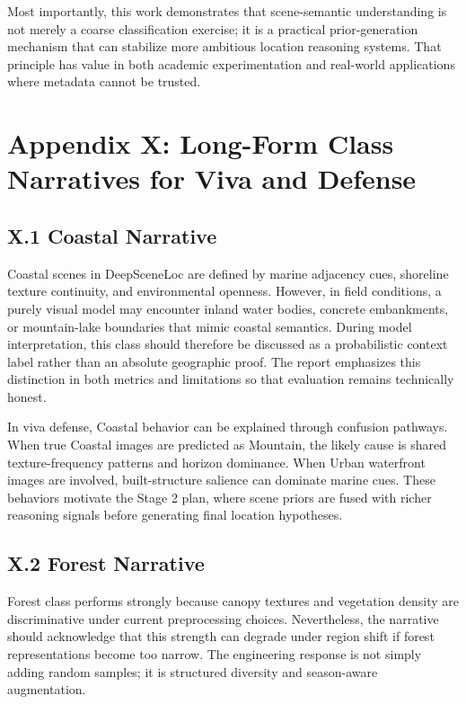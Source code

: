 Most importantly, this work demonstrates that scene-semantic understanding is not merely a coarse classification exercise; it is a practical prior-generation mechanism that can stabilize more ambitious location reasoning systems. That principle has value in both academic experimentation and real-world applications where metadata cannot be trusted.

\section*{Appendix X: Long-Form Class Narratives for Viva and Defense}

\subsection*{X.1 Coastal Narrative}
Coastal scenes in DeepSceneLoc are defined by marine adjacency cues, shoreline texture continuity, and environmental openness. However, in field conditions, a purely visual model may encounter inland water bodies, concrete embankments, or mountain-lake boundaries that mimic coastal semantics. During model interpretation, this class should therefore be discussed as a probabilistic context label rather than an absolute geographic proof. The report emphasizes this distinction in both metrics and limitations so that evaluation remains technically honest.

In viva defense, Coastal behavior can be explained through confusion pathways. When true Coastal images are predicted as Mountain, the likely cause is shared texture-frequency patterns and horizon dominance. When Urban waterfront images are involved, built-structure salience can dominate marine cues. These behaviors motivate the Stage 2 plan, where scene priors are fused with richer reasoning signals before generating final location hypotheses.

\subsection*{X.2 Forest Narrative}
Forest class performs strongly because canopy textures and vegetation density are discriminative under current preprocessing choices. Nevertheless, the narrative should acknowledge that this strength can degrade under region shift if forest representations become too narrow. The engineering response is not simply adding random samples; it is structured diversity and season-aware augmentation.


